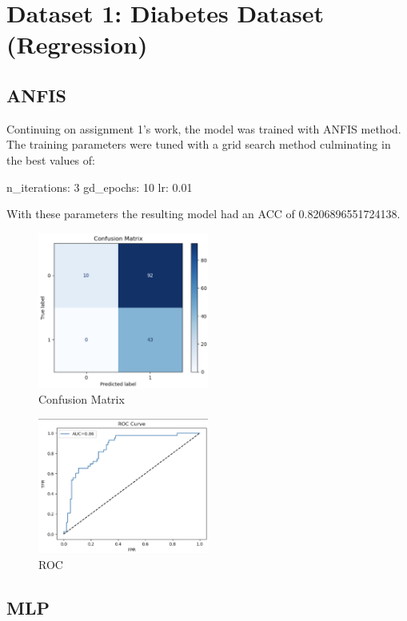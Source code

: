 \section{Dataset 1: Diabetes Dataset (Regression)}

\subsection{ANFIS}

Continuing on assignment 1's work, the model was trained with ANFIS method. The training parameters were tuned with a grid search method culminating in the best values of:

n\_iterations: 3
gd\_epochs: 10
lr: 0.01

With these parameters the resulting model had an ACC of 0.8206896551724138.

\begin{figure}[h!]
    \centering
    \includegraphics[width=0.5\textwidth]{Plots/ConfusionMatrixANFIS.png}
    \caption{Confusion Matrix}
    \label{fig:my_label}
\end{figure}

\begin{figure}[h!]
    \centering
    \includegraphics[width=0.5\textwidth]{Plots/RoCANFIS.png}
    \caption{ROC}
    \label{fig:my_label}
\end{figure}

\subsection{MLP}


